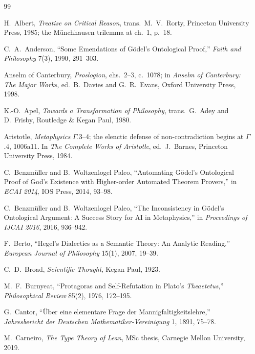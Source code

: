 \documentclass[11pt]{article}
\begin{document}
\begin{thebibliography}{99}

 H.\ Albert, \emph{Treatise on Critical Reason}, trans.\ M.\ V.\ Rorty, Princeton University Press, 1985; the M\"unchhausen trilemma at ch.\ 1, p.\ 18.

 C.\ A.\ Anderson, ``Some Emendations of G\"odel's Ontological Proof,'' \emph{Faith and Philosophy} 7(3), 1990, 291--303.

 Anselm of Canterbury, \emph{Proslogion}, chs.\ 2--3, c.\ 1078; in \emph{Anselm of Canterbury: The Major Works}, ed.\ B.\ Davies and G.\ R.\ Evans, Oxford University Press, 1998.

 K.-O.\ Apel, \emph{Towards a Transformation of Philosophy}, trans.\ G.\ Adey and D.\ Frisby, Routledge \& Kegan Paul, 1980.

 Aristotle, \emph{Metaphysics} $\Gamma$.3--4; the elenctic defense of non-contradiction begins at $\Gamma$.4, 1006a11. In \emph{The Complete Works of Aristotle}, ed.\ J.\ Barnes, Princeton University Press, 1984.

 C.\ Benzm\"uller and B.\ Woltzenlogel Paleo, ``Automating G\"odel's Ontological Proof of God's Existence with Higher-order Automated Theorem Provers,'' in \emph{ECAI 2014}, IOS Press, 2014, 93--98.

 C.\ Benzm\"uller and B.\ Woltzenlogel Paleo, ``The Inconsistency in G\"odel's Ontological Argument: A Success Story for AI in Metaphysics,'' in \emph{Proceedings of IJCAI 2016}, 2016, 936--942.

 F.\ Berto, ``Hegel's Dialectics as a Semantic Theory: An Analytic Reading,'' \emph{European Journal of Philosophy} 15(1), 2007, 19--39.

 C.\ D.\ Broad, \emph{Scientific Thought}, Kegan Paul, 1923.

 M.\ F.\ Burnyeat, ``Protagoras and Self-Refutation in Plato's \emph{Theaetetus},'' \emph{Philosophical Review} 85(2), 1976, 172--195.

 G.\ Cantor, ``\"Uber eine elementare Frage der Mannigfaltigkeitslehre,'' \emph{Jahresbericht der Deutschen Mathematiker-Vereinigung} 1, 1891, 75--78.

 M.\ Carneiro, \emph{The Type Theory of Lean}, MSc thesis, Carnegie Mellon University, 2019.


\end{thebibliography}
\end{document}
